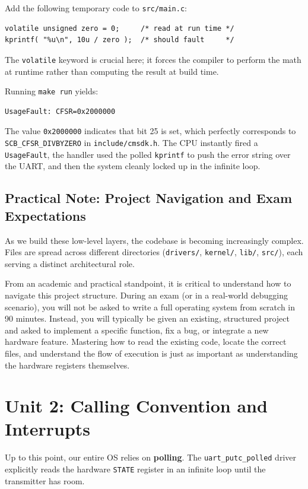 Add the following temporary code to \texttt{src/main.c}:
\begin{lstlisting}
volatile unsigned zero = 0;     /* read at run time */
kprintf( "%u\n", 10u / zero );  /* should fault     */
\end{lstlisting}
The \texttt{volatile} keyword is crucial here; it forces the compiler to perform the math at runtime rather than computing the result at build time.

Running \texttt{make run} yields:
\begin{verbatim}
UsageFault: CFSR=0x2000000
\end{verbatim}

The value \texttt{0x2000000} indicates that bit 25 is set, which perfectly corresponds to \texttt{SCB\_CFSR\_DIVBYZERO} in \texttt{include/cmsdk.h}. The CPU instantly fired a \texttt{UsageFault}, the handler used the polled \texttt{kprintf} to push the error string over the UART, and then the system cleanly locked up in the infinite loop.

\subsection{Practical Note: Project Navigation and Exam Expectations}
As we build these low-level layers, the codebase is becoming increasingly complex. Files are spread across different directories (\texttt{drivers/}, \texttt{kernel/}, \texttt{lib/}, \texttt{src/}), each serving a distinct architectural role.

From an academic and practical standpoint, it is critical to understand how to navigate this project structure. During an exam (or in a real-world debugging scenario), you will not be asked to write a full operating system from scratch in 90 minutes. Instead, you will typically be given an existing, structured project and asked to implement a specific function, fix a bug, or integrate a new hardware feature. Mastering how to read the existing code, locate the correct files, and understand the flow of execution is just as important as understanding the hardware registers themselves.


\section{Unit 2: Calling Convention and Interrupts}
Up to this point, our entire OS relies on \textbf{polling}. The \texttt{uart\_putc\_polled} driver explicitly reads the hardware \texttt{STATE} register in an infinite loop until the transmitter has room.

